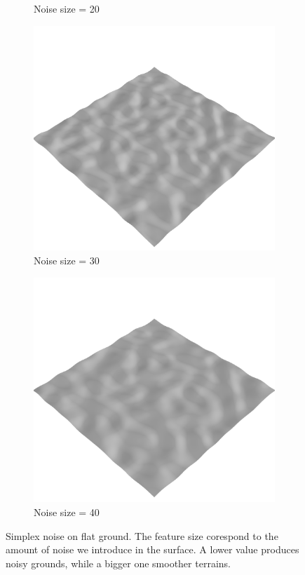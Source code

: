 \documentclass[../document.tex]{subfiles}
\begin{document}
\begin{figure}[htbp]
\begin{subfigure}[b]{0.23\linewidth}
            \caption{Noise size = 20}
            \end{subfigure}    
          \begin{subfigure}[b]{0.23\textwidth}
            \includegraphics[width=\textwidth]{../img/data-aug/3d/simplex3.png}
            \caption{Noise size = 30}
        \end{subfigure}    
        \begin{subfigure}[b]{0.23\textwidth}
            \includegraphics[width=\textwidth]{../img/data-aug/3d/simplex4.png}
            \caption{Noise size = 40}
        \end{subfigure}    
    \caption{Simplex noise on flat ground. The feature size corespond to the amount of noise we introduce in the surface. A lower value produces noisy grounds, while a bigger one smoother terrains.}    
    \label{fig : simplex-noise}

\end{figure}
\end{document}
